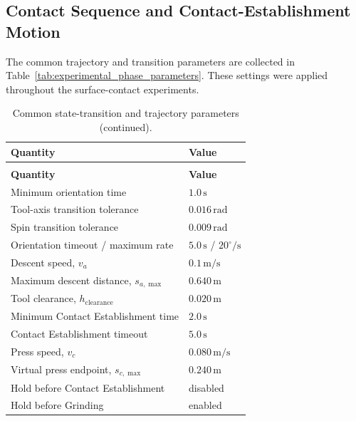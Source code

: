 \subsection{Contact Sequence and Contact-Establishment Motion}
\label{subsec:fixed_phase_motion_parameters}
\label{subsec:experimental_case_jn_settings}
\label{sec:contact_experimental_procedure}
\label{sec:experimental_procedure_contact}

The common trajectory and transition parameters are collected in
Table~\ref{tab:experimental_phase_parameters}. These settings were applied
throughout the surface-contact experiments.

\begingroup
\small
\begin{longtable}{@{}p{}p{}@{}}
\caption{Common state-transition and trajectory parameters.}
\label{tab:experimental_phase_parameters}
\label{tab:experimental_case_dh_parameters}\\
\toprule
\textbf{Quantity} & \textbf{Value}\\
\midrule
\endfirsthead
\caption[]{Common state-transition and trajectory parameters (continued).}\\
\toprule
\textbf{Quantity} & \textbf{Value}\\
\midrule
\endhead
\midrule
\endfoot
\bottomrule
\endlastfoot
Minimum orientation time & \(1.0\,\mathrm{s}\)\\
Tool-axis transition tolerance & \(0.016\,\mathrm{rad}\)\\
Spin transition tolerance & \(0.009\,\mathrm{rad}\)\\
Orientation timeout / maximum rate & \(5.0\,\mathrm{s}\) / \(20^\circ\!/\mathrm{s}\)\\
Descent speed, \(v_a\) & \(0.1\,\mathrm{m/s}\)\\
Maximum descent distance, \(s_{a,\max}\) & \(0.640\,\mathrm{m}\)\\
Tool clearance, \(h_{\mathrm{clearance}}\) & \(0.020\,\mathrm{m}\)\\
Minimum Contact Establishment time & \(2.0\,\mathrm{s}\)\\
Contact Establishment timeout & \(5.0\,\mathrm{s}\)\\
Press speed, \(v_c\) & \(0.080\,\mathrm{m/s}\)\\
Virtual press endpoint, \(s_{c,\max}\) & \(0.240\,\mathrm{m}\)\\
Hold before Contact Establishment & disabled\\
Hold before Grinding & enabled\\
\end{longtable}
\endgroup

